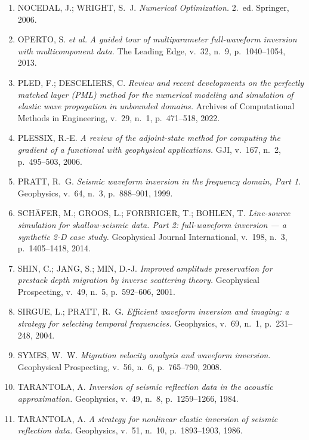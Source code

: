 \documentclass[11pt,a4paper,oneside]{report}
\begin{document}
\begin{enumerate}[leftmargin=*, itemsep=3pt]
\item NOCEDAL, J.; WRIGHT, S.~J. \emph{Numerical Optimization.} 2.~ed.
Springer, 2006.

\item OPERTO, S. \emph{et al.} \emph{A guided tour of multiparameter
full-waveform inversion with multicomponent data.} The Leading Edge, v.~32,
n.~9, p.~1040--1054, 2013.

\item PLED, F.; DESCELIERS, C. \emph{Review and recent developments on the
perfectly matched layer (PML) method for the numerical modeling and simulation
of elastic wave propagation in unbounded domains.} Archives of Computational
Methods in Engineering, v.~29, n.~1, p.~471--518, 2022.

\item PLESSIX, R.-E. \emph{A review of the adjoint-state method for computing
the gradient of a functional with geophysical applications.} GJI, v.~167,
n.~2, p.~495--503, 2006.

\item PRATT, R.~G. \emph{Seismic waveform inversion in the frequency domain,
Part 1.} Geophysics, v.~64, n.~3, p.~888--901, 1999.

\item SCH\"AFER, M.; GROOS, L.; FORBRIGER, T.; BOHLEN, T. \emph{Line-source
simulation for shallow-seismic data. Part 2: full-waveform inversion --- a
synthetic 2-D case study.} Geophysical Journal International, v.~198, n.~3,
p.~1405--1418, 2014.

\item SHIN, C.; JANG, S.; MIN, D.-J. \emph{Improved amplitude preservation for
prestack depth migration by inverse scattering theory.} Geophysical
Prospecting, v.~49, n.~5, p.~592--606, 2001.

\item SIRGUE, L.; PRATT, R.~G. \emph{Efficient waveform inversion and imaging:
a strategy for selecting temporal frequencies.} Geophysics, v.~69, n.~1,
p.~231--248, 2004.

\item SYMES, W.~W. \emph{Migration velocity analysis and waveform inversion.}
Geophysical Prospecting, v.~56, n.~6, p.~765--790, 2008.

\item TARANTOLA, A. \emph{Inversion of seismic reflection data in the acoustic
approximation.} Geophysics, v.~49, n.~8, p.~1259--1266, 1984.

\item TARANTOLA, A. \emph{A strategy for nonlinear elastic inversion of
seismic reflection data.} Geophysics, v.~51, n.~10, p.~1893--1903, 1986.


\end{enumerate}
\end{document}
